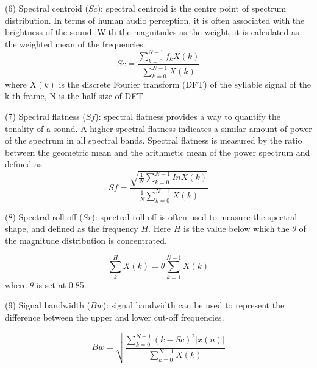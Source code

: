 



\vspace{3mm}
\noindent(6) Spectral centroid ($Sc$): spectral centroid is the centre point of spectrum distribution. In terms of human audio perception, it is often associated with the brightness of the sound. With the magnitudes as the weight, it is calculated as the weighted mean of the frequencies.
\begin{equation}
Sc=\frac{\sum_{k=0}^{N-1}f_{k}X(k)}{\sum_{k=0}^{N-1}X(k)}
\end{equation}
where $X(k)$ is the discrete Fourier transform (DFT) of the syllable signal of the k-th frame, N is the half size of DFT. 

\vspace{3mm}
\noindent(7) Spectral flatness ($Sf$): spectral flatness provides a way to quantify the tonality of a sound. A higher spectral flatness indicates a similar amount of power of the spectrum in all spectral bands. Spectral flatness is measured by the ratio between the geometric mean and the arithmetic mean of the power spectrum and defined as
\begin{equation}
Sf = \frac{\sqrt{\frac{1}{N}\sum_{k=0}^{N-1}InX(k)}}{\frac{1}{N}\sum_{k=0}^{N-1}X(k)}
\end{equation}

\vspace{3mm}

\noindent(8) Spectral roll-off ($Sr$): spectral roll-off is often used to measure the spectral shape, and defined as the frequency $H$. Here $H$ is the value below which the $\theta$ of the magnitude distribution is concentrated.

\begin{equation}
\sum_{k}^{H}X(k)=\theta \sum_{k=1}^{N-1}X(k)
\end{equation}
where $\theta$ is set at 0.85.

\vspace{3mm}

\noindent(9) Signal bandwidth ($Bw$): signal bandwidth can be used to represent the difference between the upper and lower cut-off frequencies.

\begin{equation}
Bw=\sqrt{\frac{\sum_{k=0}^{N-1}(k-Sc)^{2}|x(n)|}{\sum_{k=0}^{N-1}X(k)}}
\end{equation} 

\vspace{3mm}

